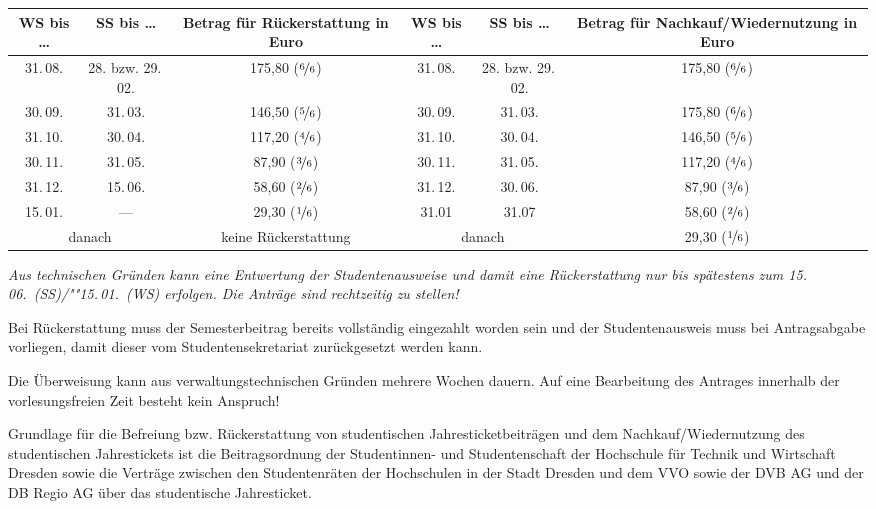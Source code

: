 \documentclass[%
	ngerman,	%
	parskip=half,
	paper=a4,%
	pagesize=auto	%
	]{scrartcl}
\begin{document}
\begin{center}
\begin{tabular}{cccccc}
	\toprule
		WS bis \dots
		& SS bis \dots
		& Betrag für Rückerstattung in Euro
		& WS bis \dots
		& SS bis \dots
		& Betrag für Nachkauf/Wiedernutzung in Euro
		\tabularnewline
	\midrule
			31.\,08.
			& 28. bzw. 29.\,02.
			& 175,80 ($\nicefrac{6}{6}$)
			& 31.\,08.
			& 28. bzw. 29.\,02.
			& 175,80 ($\nicefrac{6}{6}$)
			\tabularnewline
			30.\,09.
			& 31.\,03.
			& 146,50 ($\nicefrac{5}{6}$)
			& 30.\,09.
			& 31.\,03.
			& 175,80 ($\nicefrac{6}{6}$)
			\tabularnewline
			31.\,10.
			& 30.\,04.
			& 117,20 ($\nicefrac{4}{6}$)
			& 31.\,10.
			& 30.\,04.
			& 146,50 ($\nicefrac{5}{6}$)
			\tabularnewline
			30.\,11.
			& 31.\,05.
			& 87,90 ($\nicefrac{3}{6}$)
			& 30.\,11.
			& 31.\,05.
			& 117,20 ($\nicefrac{4}{6}$)
			\tabularnewline
			31.\,12.
			& 15.\,06.
			& 58,60 ($\nicefrac{2}{6}$)
			& 31.\,12.
			& 30.\,06.
			& 87,90 ($\nicefrac{3}{6}$)
			\tabularnewline
			15.\,01.
			& --- 
			& 29,30 ($\nicefrac{1}{6}$)
			& 31.01		
			& 31.07
			& 58,60 ($\nicefrac{2}{6}$)
			\tabularnewline
			\multicolumn{2}{c}{danach}
			& keine Rückerstattung
			&	\multicolumn{2}{c}{danach}
			& 29,30 ($\nicefrac{1}{6}$)
			\tabularnewline
	\bottomrule
\end{tabular}
\end{center}

\emph{Aus technischen Gründen kann eine Entwertung der Studentenausweise
und damit eine Rückerstattung nur bis spätestens zum
15.\,06.~(SS)/""15.\,01.~(WS) erfolgen. Die Anträge sind rechtzeitig zu stellen!}

Bei Rückerstattung muss der Semesterbeitrag bereits vollständig eingezahlt
worden sein und der Studentenausweis muss bei Antragsabgabe
vorliegen, damit dieser vom Studentensekretariat zurückgesetzt werden kann.

Die Überweisung kann aus verwaltungstechnischen Gründen mehrere Wochen
dauern. Auf eine Bearbeitung des Antrages innerhalb der vorlesungsfreien
Zeit besteht kein Anspruch!

Grundlage für die Befreiung bzw. Rückerstattung von studentischen
Jahresticketbeiträgen und dem Nachkauf/Wiedernutzung des studentischen Jahrestickets ist die
Beitragsordnung der Studentinnen- und Studentenschaft der Hochschule für Technik
und Wirtschaft Dresden sowie die Verträge zwischen den Studentenräten der
Hochschulen in der Stadt Dresden und dem VVO sowie der DVB AG und der DB Regio
AG über das studentische Jahresticket.
\end{document}
